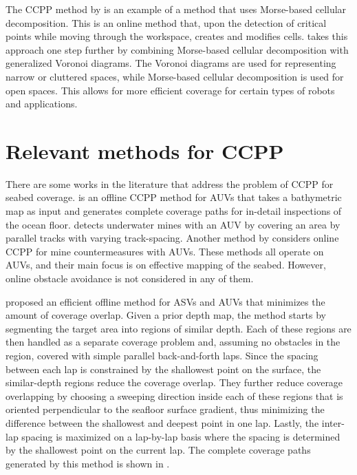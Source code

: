 The CCPP method by \citet{acar2002sensor} is an example of a method that uses Morse-based cellular decomposition. This is an online method that, upon the detection of critical points while moving through the workspace, creates and modifies cells. \citet{acar2006sensor} takes this approach one step further by combining Morse-based cellular decomposition with generalized Voronoi diagrams. The Voronoi diagrams are used for representing narrow or cluttered spaces, while Morse-based cellular decomposition is used for open spaces. This allows for more efficient coverage for certain types of robots and applications.

\section{Relevant methods for CCPP} \label{sec:lit-rev-ccpp}

There are some works in the literature that address the problem of CCPP for seabed coverage. \citet{galceran2013planning} is an offline CCPP method for AUVs that takes a bathymetric map as input and generates complete coverage paths for in-detail inspections of the ocean floor. \citet{williams2010optimal} detects underwater mines with an AUV by covering an area by parallel tracks with varying track-spacing. Another method by \citet{paull2013sensor} considers online CCPP for mine countermeasures with AUVs. These methods all operate on AUVs, and their main focus is on effective mapping of the seabed. However, online obstacle avoidance is not considered in any of them.

\citet{galceran2012efficient} proposed an efficient offline method for ASVs and AUVs that minimizes the amount of coverage overlap. Given a prior depth map, the method starts by segmenting the target area into regions of similar depth. Each of these regions are then handled as a separate coverage problem and, assuming no obstacles in the region, covered with simple parallel back-and-forth laps. Since the spacing between each lap is constrained by the shallowest point on the surface, the similar-depth regions reduce the coverage overlap. They further reduce coverage overlapping by choosing a sweeping direction inside each of these regions that is oriented perpendicular to the seafloor surface gradient, thus minimizing the difference between the shallowest and deepest point in one lap. Lastly, the inter-lap spacing is maximized on a lap-by-lap basis where the spacing is determined by the shallowest point on the current lap. The complete coverage paths generated by this method is shown in .

